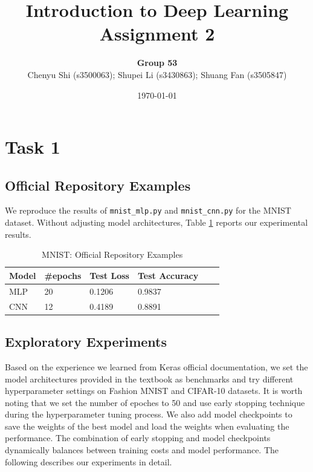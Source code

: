 \documentclass{article}
\title{Introduction to Deep Learning\\Assignment 2} %
\author{\textbf{Group 53}\\Chenyu Shi (s3500063); Shupei Li (s3430863); Shuang Fan (s3505847)} %
\date{\today} %
\begin{document}

\maketitle %

\section*{Task 1}
\setcounter{section}{1}
\setcounter{subsection}{0}
\subsection{Official Repository Examples}
We reproduce the results of \texttt{mnist\_mlp.py} and \texttt{mnist\_cnn.py} for the MNIST dataset. Without adjusting model architectures, Table \ref{tab:1-offer} reports our experimental results.
\begin{table}[!ht]
    \centering
    \caption{MNIST: Official Repository Examples}
    \label{tab:1-offer}
    \begin{tabular}{llllll}
        \toprule
        \textbf{Model} & \textbf{\#epochs} & \textbf{Test Loss} & \textbf{Test Accuracy}\\
        \midrule
        MLP & 20 & 0.1206 & 0.9837\\
        CNN & 12 & 0.4189 & 0.8891\\
        \bottomrule
    \end{tabular}
\end{table}

\subsection{Exploratory Experiments}
Based on the experience we learned from Keras official documentation, we set the model architectures provided in the textbook as benchmarks and try different hyperparameter settings on Fashion MNIST and CIFAR-10 datasets. It is worth noting that we set the number of epoches to 50 and use early stopping technique during the hyperparameter tuning process. We also add model checkpoints to save the weights of the best model and load the weights when evaluating the performance. The combination of early stopping and model checkpoints dynamically balances between training costs and model performance. The following describes our experiments in detail.
\end{document}
